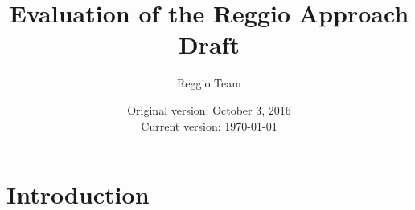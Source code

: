 






\title{\Large \textbf{Evaluation of the Reggio Approach} \\ Draft}
\author{\normalsize Reggio Team} %
\date{\normalsize Original version: October 3, 2016 \\ Current version: \today}
\maketitle

\tableofcontents

\doublespacing

%


\section{Introduction}
\label{sec:introduction}


